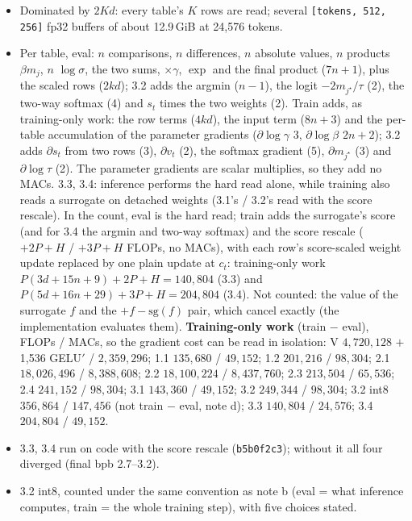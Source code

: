 \documentclass[10pt]{article}
\newcommand{\code}[1]{{\renewcommand{\_}{\textunderscore\allowbreak}\texttt{#1}}}
\newcommand{\note}[1]{\textsuperscript{\textbf{#1}}}
\begin{document}
\begin{itemize}\setlength\itemsep{0pt}\footnotesize
\item[\note{a}] Dominated by $2Kd$: every table's $K$ rows are read; several \code{[tokens, 512, 256]} fp32 buffers of about 12.9\,GiB at 24,576 tokens.
\item[\note{b}] Per table, eval: $n$ comparisons, $n$ differences, $n$ absolute values, $n$ products $\beta m_j$, $n$ $\log\sigma$, the two sums, $\times\gamma$, $\exp$ and the final product ($7n+1$), plus the scaled rows ($2kd$);
  3.2 adds the argmin ($n-1$), the logit $-2m_{j^\star}/\tau$ (2), the two-way softmax (4) and $s_t$ times the two weights (2).
  Train adds, as training-only work: the row terms ($4kd$), the input term ($8n+3$) and the per-table accumulation of the parameter gradients ($\partial\log\gamma$ 3, $\partial\log\beta$ $2n+2$);
  3.2 adds $\partial s_t$ from two rows (3), $\partial v_t$ (2), the softmax gradient (5), $\partial m_{j^\star}$ (3) and $\partial\log\tau$ (2).
  The parameter gradients are scalar multiplies, so they add no MACs.
  3.3, 3.4: inference performs the hard read alone, while training also reads a surrogate on detached weights (3.1's / 3.2's read with the score rescale).
  In the count, eval is the hard read; train adds the surrogate's score (and for 3.4 the argmin and two-way softmax) and the score rescale ($+2P+H$ / $+3P+H$ FLOPs, no MACs),
  with each row's score-scaled weight update replaced by one plain update at $c_t$: training-only work $P(3d+15n+9)+2P+H=140{,}804$ (3.3) and $P(5d+16n+29)+3P+H=204{,}804$ (3.4).
  Not counted: the value of the surrogate $f$ and the $+f-\mathrm{sg}(f)$ pair, which cancel exactly (the implementation evaluates them).
  \textbf{Training-only work} (train $-$ eval), FLOPs / MACs, so the gradient cost can be read in isolation: V $4{,}720{,}128$ $+$ 1,536 GELU$'$ / $2{,}359{,}296$; 1.1 $135{,}680$ / $49{,}152$; 1.2 $201{,}216$ / $98{,}304$;
  2.1 $18{,}026{,}496$ / $8{,}388{,}608$; 2.2 $18{,}100{,}224$ / $8{,}437{,}760$; 2.3 $213{,}504$ / $65{,}536$; 2.4 $241{,}152$ / $98{,}304$; 3.1 $143{,}360$ / $49{,}152$; 3.2 $249{,}344$ / $98{,}304$;
  3.2 int8 $356{,}864$ / $147{,}456$ (not train $-$ eval, note d); 3.3 $140{,}804$ / $24{,}576$; 3.4 $204{,}804$ / $49{,}152$.
\item[\note{c}] 3.3, 3.4 run on code with the score rescale (\code{b5b0f2c3}); without it all four diverged (final bpb 2.7--3.2).
\item[\note{d}] 3.2 int8, counted under the same convention as note b (eval = what inference computes, train = the whole training step), with five choices stated.

\end{itemize}
\end{document}
